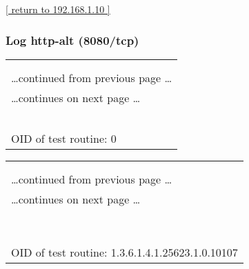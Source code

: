 \documentclass{article}
\begin{document}
\begin{footnotesize}\hyperref[host:192.168.1.10]{[ return to 192.168.1.10 ]}\end{footnotesize}
\subsubsection{Log http-alt (8080/tcp)}
\label{port:192.168.1.10 http-alt (8080/tcp) Log}

\begin{longtable}{|p{}|}
\hline
\rowcolor{openvas_log}{\color{white}{Log}}\\
\rowcolor{openvas_log}{\color{white}{NVT: }}\\
\hline
\endfirsthead
\hfill\ldots continued from previous page \ldots \\
\hline
\endhead
\hline
\ldots continues on next page \ldots \\
\endfoot
\hline
\endlastfoot
\\
\rowcolor{white}{\verb=Open port.=}\\
\rowcolor{white}{\verb==}\\
\rowcolor{white}{\verb==}\\
\\
OID of test routine: 0\\
\end{longtable}

\begin{longtable}{|p{}|}
\hline
\rowcolor{openvas_log}{\color{white}{Log (CVSS: 0.0) }}\\
\rowcolor{openvas_log}{\color{white}{NVT: HTTP Server type and version}}\\
\hline
\endfirsthead
\hfill\ldots continued from previous page \ldots \\
\hline
\endhead
\hline
\ldots continues on next page \ldots \\
\endfoot
\hline
\endlastfoot
\\
\rowcolor{white}{\verb=The remote web server type is :=}\\
\rowcolor{white}{\verb=Apache-Coyote/1.1 =}\\
\rowcolor{white}{\verb=and the 'ServerTokens' directive is ProductOnly=}\\
\rowcolor{white}{\verb=Apache does not permit to hide the server type.=}\\
\rowcolor{white}{\verb==}\\
\rowcolor{white}{\verb==}\\
\\
OID of test routine: 1.3.6.1.4.1.25623.1.0.10107\\
\end{longtable}
\end{document}
